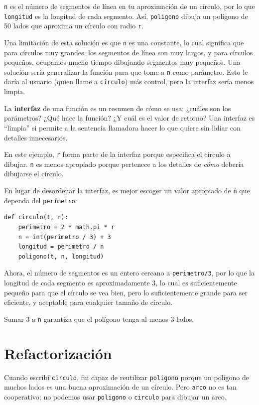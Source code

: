 \documentclass[10pt]{book}
\begin{document}
{\tt n} es el número de segmentos de línea en tu aproximación de un círculo,
por lo que {\tt longitud} es la longitud de cada segmento.  Así, {\tt poligono}
dibuja un polígono de 50 lados que aproxima un círculo con radio {\tt r}.

Una limitación de esta solución es que {\tt n} es una constante, lo cual
significa que para círculos muy grandes, los segmentos de línea son muy largos, y
para círculos pequeños, ocupamos mucho tiempo dibujando segmentos muy pequeños.  Una
solución sería generalizar la función para que tome a {\tt n} como
parámetro.  Esto le daría al usuario (quien llame a {\tt circulo})
más control, pero la interfaz sería menos limpia.

La {\bf interfaz} de una función es un resumen de cómo se usa: ¿cuáles
son los parámetros?  ¿Qué hace la función?  ¿Y cuál es el valor de
retorno?  Una interfaz es ``limpia'' si permite a la sentencia llamadora hacer
lo que quiere sin lidiar con detalles innecesarios.

En este ejemplo, {\tt r} forma parte de la interfaz porque
especifica el círculo a dibujar.  {\tt n} es menos apropiado
porque pertenece a los detalles de {\em cómo} debería dibujarse
el círculo.

En lugar de desordenar la interfaz, es mejor
escoger un valor apropiado de {\tt n}
que dependa del {\tt perímetro}:

\begin{verbatim}
def circulo(t, r):
    perimetro = 2 * math.pi * r
    n = int(perimetro / 3) + 3
    longitud = perimetro / n
    poligono(t, n, longitud)
\end{verbatim}
%
Ahora, el número de segmentos es un entero cercano a {\tt perimetro/3},
por lo que la longitud de cada segmento es aproximadamente 3, lo cual es suficientemente
pequeño para que el círculo se vea bien, pero lo suficientemente grande para ser eficiente,
y aceptable para cualquier tamaño de círculo.

Sumar 3 a {\tt n} garantiza que el polígono tenga al menos 3 lados.


\section{Refactorización}
\label{refactoring}

Cuando escribí {\tt circulo}, fui capaz de reutilizar {\tt poligono}
porque un polígono de muchos lados es una buena aproximación de un círculo.
Pero {\tt arco} no es tan cooperativo; no podemos usar {\tt poligono}
o {\tt circulo} para dibujar un arco.
\end{document}
